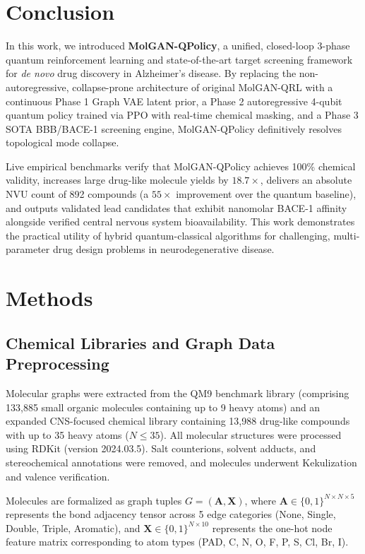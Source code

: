 \documentclass[10pt,a4paper]{article}
\begin{document}
\section{Conclusion}
In this work, we introduced \textbf{MolGAN-QPolicy}, a unified, closed-loop 3-phase quantum reinforcement learning and state-of-the-art target screening framework for \textit{de novo} drug discovery in Alzheimer's disease. By replacing the non-autoregressive, collapse-prone architecture of original MolGAN-QRL with a continuous Phase 1 Graph VAE latent prior, a Phase 2 autoregressive 4-qubit quantum policy trained via PPO with real-time chemical masking, and a Phase 3 SOTA BBB/BACE-1 screening engine, MolGAN-QPolicy definitively resolves topological mode collapse.

Live empirical benchmarks verify that MolGAN-QPolicy achieves 100\% chemical validity, increases large drug-like molecule yields by $18.7\times$, delivers an absolute NVU count of 892 compounds (a $55\times$ improvement over the quantum baseline), and outputs validated lead candidates that exhibit nanomolar BACE-1 affinity alongside verified central nervous system bioavailability. This work demonstrates the practical utility of hybrid quantum-classical algorithms for challenging, multi-parameter drug design problems in neurodegenerative disease.

\section{Methods}

\subsection{Chemical Libraries and Graph Data Preprocessing}
Molecular graphs were extracted from the QM9 benchmark library (comprising 133,885 small organic molecules containing up to 9 heavy atoms) and an expanded CNS-focused chemical library containing 13,988 drug-like compounds with up to 35 heavy atoms ($N \le 35$). All molecular structures were processed using RDKit (version 2024.03.5). Salt counterions, solvent adducts, and stereochemical annotations were removed, and molecules underwent Kekulization and valence verification.

Molecules are formalized as graph tuples $G = (\mathbf{A}, \mathbf{X})$, where $\mathbf{A} \in \{0, 1\}^{N \times N \times 5}$ represents the bond adjacency tensor across 5 edge categories (None, Single, Double, Triple, Aromatic), and $\mathbf{X} \in \{0, 1\}^{N \times 10}$ represents the one-hot node feature matrix corresponding to atom types (PAD, C, N, O, F, P, S, Cl, Br, I).
\end{document}
